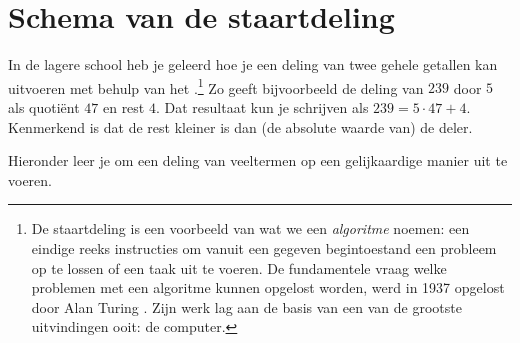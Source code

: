 \documentclass{ximera}
\begin{document}
	\author{Koen De Naeghel}
	\label{xim:veeltermen_schema_van_de_staartdeling}


\section{Schema van de staartdeling}

In de lagere school heb je geleerd hoe je een deling van twee gehele getallen kan uitvoeren met behulp van het .\footnote{De staartdeling is een voorbeeld van wat we een {\em algoritme} noemen: een eindige reeks instructies om vanuit een gegeven begintoestand een probleem op te lossen of een taak uit te voeren. De fundamentele vraag welke problemen met een algoritme kunnen opgelost worden, werd in 1937 opgelost door Alan Turing \cite{Turing}. Zijn werk lag aan de basis van een van de grootste uitvindingen ooit: de computer.} Zo geeft bijvoorbeeld de deling van $239$ door $5$ als quoti\"ent $47$ en rest $4$. Dat resultaat kun je schrijven als $239 = 5 \cdot 47 + 4$. Kenmerkend is dat de rest kleiner is dan (de absolute waarde van) de deler. 

Hieronder leer je om een deling van veeltermen op een gelijkaardige manier uit te voeren.
\end{document}
